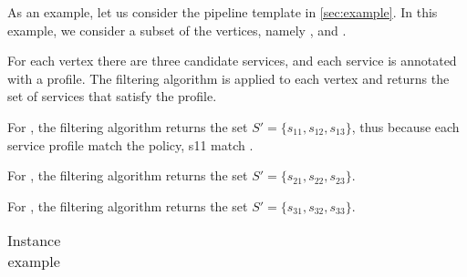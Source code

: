 \begin{example}\label{ex:instance}

  As an example, let us consider the pipeline template \tChartFunction in \cref{sec:example}.
  In this example, we consider a subset of the vertices, namely ,  and .

  For each vertex there are three candidate services, and each service is annotated with a profile.
  The filtering algorithm is applied to each vertex and returns the set of services that satisfy the profile.
  \begin{enumerate*}[label=(\roman*)]
    \item For , the filtering algorithm returns the set $S'=\{s_{11},s_{12},s_{13}\}$, thus because each service profile match the policy,
          s11 match .
    \item For , the filtering algorithm returns the set $S'=\{s_{21},s_{22},s_{23}\}$.
    \item For , the filtering algorithm returns the set $S'=\{s_{31},s_{32},s_{33}\}$.

  \end{enumerate*}




  \begin{table*}
    \def\arraystretch{1.5}
    \caption{Instance example}\label{tab:instance_example}

    \centering
    \begin{tabular}{l|l|l|c|c}


\end{tabular}
\end{table*}
\end{example}
